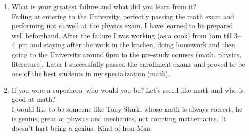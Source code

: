 \documentclass{article}
\begin{document}
\begin{enumerate}
  \item What is your greatest failure and what did you learn from it?\\
    Failing at entering to the University, perfectly passing the math exam and
    performing not so well at the physics exam. I have learned to be prepared
    well beforehand. After the failure I was working (as a cook) from 7am till
    3--4~pm and staying after the work in the kitchen, doing homework and then
    going to the University around 6pm to the pre-study courses (math,
    physics, literature). Later I successfully passed the enrollment exams and
    proved to be one of the best students in my specialization (math).

  \item If you were a superhero, who would you be?
  Let's see\ldots I like math and who is good at math?\\
  I would like to be someone like Tony Stark, whose math is always correct, he
  is genius, great at physics and mechanics, not counting mathematics.
  It doesn't hurt being a genius.
  Kind of Iron Man

\end{enumerate}
\end{document}

